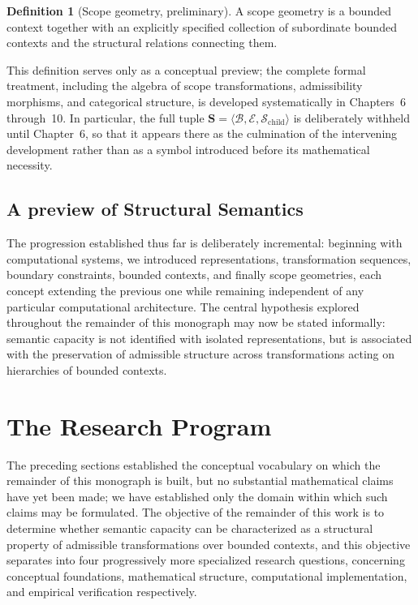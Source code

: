 \documentclass[11pt,twoside,openright]{book}
\numberwithin{equation}{chapter}
\theoremstyle{definition}
\newtheorem{definition}{Definition}[chapter]
\theoremstyle{plain}
\theoremstyle{remark}
\theoremstyle{definition}
\newcommand{\Scope}{\mathbf{S}}
\newcommand{\Boundary}{\mathcal{B}}
\newcommand{\Interior}{\mathcal{E}}
\newcommand{\Children}{\mathcal{S}_{\mathrm{child}}}
\begin{document}
\begin{definition}[Scope geometry, preliminary]
A scope geometry is a bounded context together with an explicitly
specified collection of subordinate bounded contexts and the structural
relations connecting them.
\end{definition}

This definition serves only as a conceptual preview; the complete formal
treatment, including the algebra of scope transformations, admissibility
morphisms, and categorical structure, is developed systematically in
Chapters~6 through~10. In particular, the full tuple
$\Scope=\langle\Boundary,\Interior,\Children\rangle$ is deliberately
withheld until Chapter~6, so that it appears there as the culmination of
the intervening development rather than as a symbol introduced before its
mathematical necessity.

\subsection{A preview of Structural Semantics}

The progression established thus far is deliberately incremental:
beginning with computational systems, we introduced representations,
transformation sequences, boundary constraints, bounded contexts, and
finally scope geometries, each concept extending the previous one while
remaining independent of any particular computational architecture. The
central hypothesis explored throughout the remainder of this monograph
may now be stated informally: semantic capacity is not identified with
isolated representations, but is associated with the preservation of
admissible structure across transformations acting on hierarchies of
bounded contexts.

\section{The Research Program}

The preceding sections established the conceptual vocabulary on which the
remainder of this monograph is built, but no substantial mathematical
claims have yet been made; we have established only the domain within
which such claims may be formulated. The objective of the remainder of
this work is to determine whether semantic capacity can be characterized
as a structural property of admissible transformations over bounded
contexts, and this objective separates into four progressively more
specialized research questions, concerning conceptual foundations,
mathematical structure, computational implementation, and empirical
verification respectively.
\end{document}
